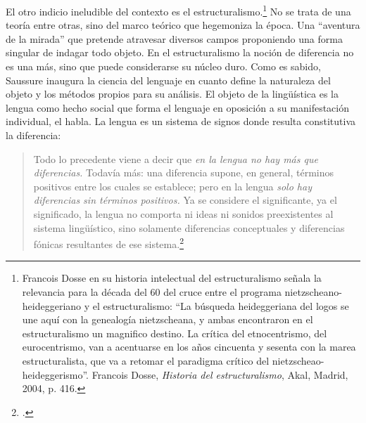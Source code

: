 El otro indicio ineludible del contexto es el
estructuralismo.\footnote{Francois Dosse en su historia intelectual del
  estructuralismo señala la relevancia para la década del 60 del cruce
  entre el programa nietzscheano-heideggeriano y el estructuralismo: \enquote{La
  búsqueda heideggeriana del logos se une aquí con la genealogía
  nietzscheana, y ambas encontraron en el estructuralismo un magnifico
  destino. La crítica del etnocentrismo, del eurocentrismo, van a
  acentuarse en los años cincuenta y sesenta con la marea
  estructuralista, que va a retomar el paradigma crítico del
  nietzscheao-heideggerismo}. Francois Dosse, \emph{Historia del
  estructuralismo}, Akal, Madrid, 2004, p. 416.} No se trata de una
teoría entre otras, sino del marco teórico que hegemoniza la época. Una
\enquote{aventura de la mirada} que pretende atravesar diversos campos
proponiendo una forma singular de indagar todo objeto. En el
estructuralismo la noción de diferencia no es una más, sino que puede
considerarse su núcleo duro. Como es sabido, Saussure inaugura la
ciencia del lenguaje en cuanto define la naturaleza del objeto y los
métodos propios para su análisis. El objeto de la lingüística es la
lengua como hecho social que forma el lenguaje en oposición a su
manifestación individual, el habla. La lengua es un sistema de signos
donde resulta constitutiva la diferencia:

\begin{quote}
Todo lo precedente viene a decir que \emph{en la lengua no hay más que
diferencias.} Todavía más: una diferencia supone, en general, términos
positivos entre los cuales se establece; pero en la lengua \emph{solo
hay diferencias sin términos positivos.} Ya se considere el
significante, ya el significado, la lengua no comporta ni ideas ni
sonidos preexistentes al sistema lingüístico, sino solamente diferencias
conceptuales y diferencias fónicas resultantes de ese
sistema.\footcite[144]{saussure1945}
\end{quote}

